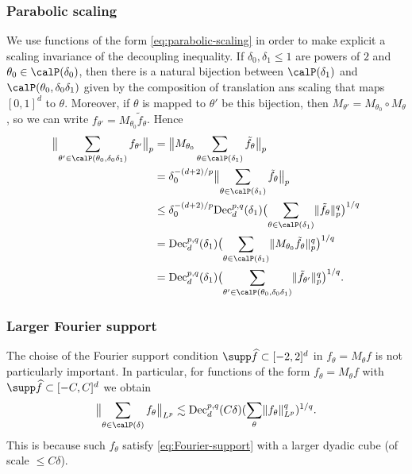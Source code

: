 \subsubsection{Parabolic scaling}\label{sec:parabolic-scaling}
We use functions of the form \eqref{eq:parabolic-scaling} in order to make explicit a scaling invariance of the decoupling inequality.
If $\delta_{0},\delta_{1} \leq 1$ are powers of $2$ and $\theta_{0} \in \Part{\delta_{0}}$, then there is a natural bijection between $\Part{\delta_{1}}$ and $\Part[\theta_{0}]{\delta_{0}\delta_{1}}$ given by the composition of translation ans scaling that maps $[0,1]^{d}$ to $\theta$.
Moreover, if $\theta$ is mapped to $\theta'$ be this bijection, then $M_{\theta'} = M_{\theta_{0}} \circ M_{\theta}$, so we can write $f_{\theta'} = M_{\theta_{0}} \tilde{f}_{\theta}$.
Hence
\begin{align*}
\norm[\big]{\sum_{\theta' \in \Part[\theta_{0}]{\delta_{0}\delta_{1}}} f_{\theta'}}_{p}
&=
\norm[\big]{M_{\theta_{0}} \sum_{\theta \in \Part{\delta_{1}}} \tilde{f}_{\theta}}_{p}\\
&=
\delta_{0}^{-(d+2)/p} \norm[\big]{\sum_{\theta \in \Part{\delta_{1}}} \tilde{f}_{\theta}}_{p}\\
&\leq
\delta_{0}^{-(d+2)/p} \Dec_{d}^{p,q}(\delta_{1}) \bigl( \sum_{\theta \in \Part{\delta_{1}}} \norm{ \tilde{f}_{\theta} }_{p}^q \bigr)^{1/q}\\
&=
\Dec_{d}^{p,q}(\delta_{1}) \bigl( \sum_{\theta \in \Part{\delta_{1}}} \norm{ M_{\theta_{0}} \tilde{f}_{\theta} }_{p}^q \bigr)^{1/q}\\
&=
\Dec_{d}^{p,q}(\delta_{1}) \bigl( \sum_{\theta' \in \Part[\theta_{0}]{\delta_{0}\delta_{1}}} \norm{ \tilde{f}_{\theta'} }_{p}^q \bigr)^{1/q}.
\end{align*}


\subsubsection{Larger Fourier support}\label{sec:dec-larger-Fourier-supp}
The choise of the Fourier support condition $\supp \widehat{f} \subset [-2,2]^{d}$ in $f_{\theta} = M_{\theta} f$ is not particularly important.
In particular, for functions of the form $f_{\theta} = M_{\theta} f$ with $\supp \widehat{f} \subset [-C,C]^{d}$ we obtain
\begin{equation}\label{eq:dec-larger-Fourier-support}
\norm[\big]{\sum_{\theta \in \Part{\delta}} f_{\theta}}_{L^p}
\lesssim
\Dec_{d}^{p,q}(C\delta) (\sum_{\theta} \norm{f_{\theta}}_{L^p}^q)^{1/q}.
\end{equation}
This is because such $f_{\theta}$ satisfy \eqref{eq:Fourier-support} with a larger dyadic cube (of scale $\leq C\delta$).

